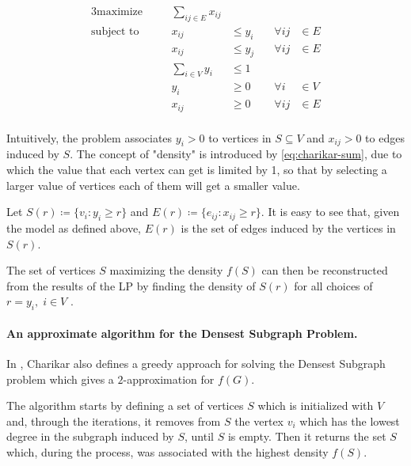 \begin{alignat}{3}
	\label{eq:charikar-model-densest-subgraph}
	\text{maximize}   &       & \sum_{ij \in E} x_{ij}                                          \\
	\text{subject to} & \quad & x_{ij}                  & \leq y_{i} & \quad \forall ij & \in E \\
	                  &       & x_{ij}                  & \leq y_{j} & \quad \forall ij & \in E \\
	                  &       & \sum^{}_{i \in V} y_{i} & \leq 1     &                          \\
	\label{eq:charikar-sum}
	                  &       & y_{i}                   & \geq 0     & \quad \forall i  & \in V \\
	                  &       & x_{ij}                  & \geq 0     & \quad \forall ij & \in E \\
\end{alignat}

Intuitively, the problem associates $y_i > 0$ to vertices in $S \subseteq V$
and $x_{ij} > 0$ to edges induced by $S$. The concept of "density" is
introduced by \autoref{eq:charikar-sum}, due to which the value that each
vertex can get is limited by 1, so that by selecting a larger value of vertices
each of them will get a smaller value.

Let $S(r) \coloneqq \{v_{i} : y_{i} \geq r\} $ and $E(r) \coloneqq \{e_{ij} :
	x_{ij} \geq r\} $. It is easy to see that, given the model as defined
above, $E(r)$ is the set of edges induced by the vertices in $S(r)$.

The set of vertices $S$ maximizing the density $f(S)$ can then be reconstructed
from the results of the \acrshort{LP} by finding the density of $S(r)$
for all choices of $r = y_{i}, \; i \in V $ \cite{charikar2000greedy}.

\paragraph{An approximate algorithm for the Densest Subgraph Problem.}%
\label{par:an_approximate_algorithm_for_the_densest_subgraph_problem}

In \cite{charikar2000greedy}, Charikar also defines a greedy approach for
solving the Densest Subgraph problem which gives a $2$-approximation for
$f(G)$.

The algorithm starts by defining a set of vertices $S$ which is initialized
with $V$ and, through the iterations, it removes from $S$ the vertex $v_i$
which has the lowest degree in the subgraph induced by $S$, until $S$ is empty.
Then it returns the set $S$ which, during the process, was associated with the
highest density $f(S)$.


